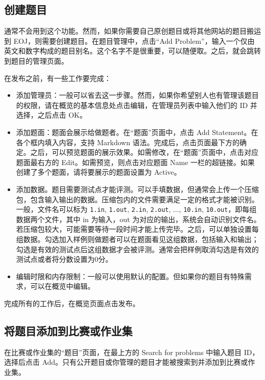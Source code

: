 \documentclass[oneside]{book}
\begin{document}
\subsection{创建题目}

\label{ssec:create_new}

通常不会用到这个功能。然而，如果你需要自己原创题目或将其他网站的题目搬运到 EOJ，则需要创建题目。在题目管理中，点击``Add Problem''，输入一个仅由英文和数字构成的题目别名。这个名字不是很重要，可以随便取。之后，就会跳转到题目的管理页面。

在发布之前，有一些工作要完成：

\begin{itemize}
  \item 添加管理员：一般可以省去这一步骤。然而，如果你希望别人也有管理该题目的权限，请在概览的基本信息处点击编辑，在管理员列表中输入他们的 ID 并选择，之后点击 OK。
  \item 添加题面：题面会展示给做题者。在``题面''页面中，点击 Add Statement。在各个框内填入内容，支持 Markdown 语法。完成后，点击页面最下方的确定。之后，可以预览题面的展示效果。如需修改，在``题面''页面中，点击对应题面最右方的 Edit。如需预览，则点击对应题面 Name 一栏的超链接。如果创建了多个题面，请将要展示的题面设置为 Active。
  \item 添加数据。题目需要测试点才能评测。可以手填数据，但通常会上传一个压缩包，包含输入输出的数据。压缩包内的文件需要满足一定的格式才能被识别。一般，文件名可以标为 \lstinline|1.in|, \lstinline|1.out|, \lstinline|2.in|, \lstinline|2.out|, $\dots$, \lstinline|10.in|, \lstinline|10.out|，即每组数据两个文件，其中 in 为输入，out 为对应的输出，系统会自动识别文件名。若压缩包较大，可能需要等待一段时间才能上传完毕。之后，可以单独设置每组数据。勾选加入样例则做题者可以在题面看见这组数据，包括输入和输出；勾选是有效的测试点后这组数据才会被评测。通常会把样例取消勾选是有效的测试点或者将分数设置为0分。
  \item 编辑时限和内存限制：一般可以使用默认的配置。但如果你的题目有特殊需求，可以在概览中编辑。
\end{itemize}

完成所有的工作后，在概览页面点击发布。

\subsection{将题目添加到比赛或作业集}

\label{ssec:add_problem_to_homework_set}

在比赛或作业集的``题目''页面，在最上方的 Search for problems 中输入题目 ID，选择后点击 Add。只有公开题目或你管理的题目才能被搜索到并添加到比赛或作业集。
\end{document}
